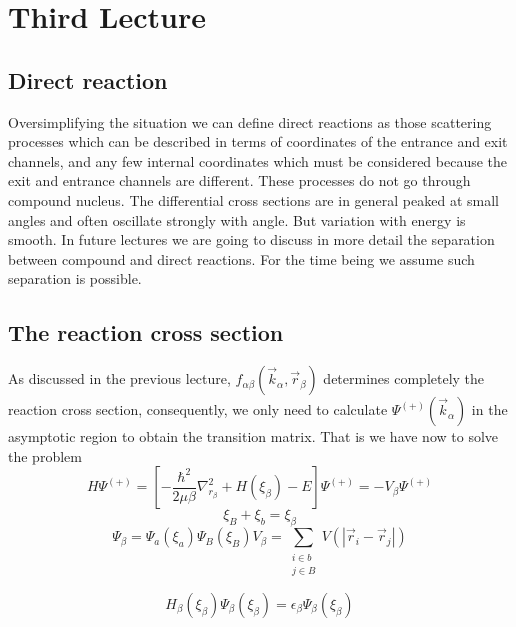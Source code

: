 \chapter{Third Lecture}\label{C4}
\section{Direct reaction}
Oversimplifying the situation we can define direct reactions as those scattering processes which can be described in terms of coordinates of the entrance and exit channels, and any few internal coordinates which must be considered because the exit and entrance channels are different. These processes do not go through compound nucleus. The differential cross sections are in general peaked at small angles and often oscillate strongly with angle. But variation with energy is smooth. In future lectures we are going to discuss in more detail the separation between compound and direct reactions. For the time being we assume such separation is possible.
\section{The reaction cross section}
As discussed in the previous lecture, $f_{\alpha \beta}(\vec{k}_\alpha, \vec{r}_\beta)$ determines completely the reaction cross section, consequently, we only need to calculate $\Psi^{(+)}(\vec{k}_\alpha)$ in the asymptotic region to obtain the transition matrix. That is we have now to solve the problem
\begin{equation}\label{eq1}
 H\Psi^{(+)}=\left[ -\frac{\hbar^2}{2\mu \beta} \nabla^2_{r_ \beta}+ H(\xi_\beta)-E\right] \Psi^{(+)}=-V_\beta \Psi^{(+)}
\end{equation}
\begin{equation}\label{eq2}
\xi_B+\xi_b=\xi_\beta
\end{equation}
\begin{subequations}
 \begin{equation}\label{eq3a}
\Psi_ \beta=\Psi_ a(\xi_a)\Psi_ B(\xi_B)
\end{equation}

\begin{equation}\label{eq3b}
V_\beta=\sum_{\substack{i\in b \\ j\in B}} V(|\vec{r}_i-\vec{r}_j|)
\end{equation}
\end{subequations}

\begin{equation}\label{eq4}
H_\beta(\xi_\beta)\Psi_ \beta(\xi_\beta)=\epsilon_ \beta\Psi_ \beta(\xi_\beta)
\end{equation}

